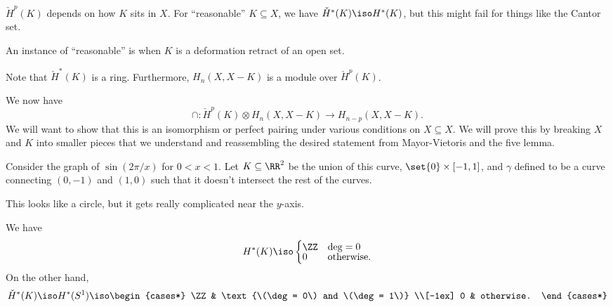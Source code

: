 \documentclass{standalone}
\begin{document}
\begin{remark}
  \(\check{H}^p(K)\) depends on how \(K\) sits in \(X\).
  For ``reasonable'' \(K \subseteq X\),
  we have \(\check{H}^*(K) \iso H^*(K)\),
  but this might fail for things like the Cantor set.

  An instance of ``reasonable'' is when \(K\) is a deformation retract
  of an open set.
\end{remark}

Note that \(\check{H}^*(K)\) is a ring.
Furthermore, \(H_n(X, X-K)\) is a module over \(\check{H}^p(K)\).

We now have
\[
  \cap \colon \check{H}^p(K) \otimes H_n(X, X-K) \to H_{n-p}(X, X-K).
\]
We will want to show that this is an isomorphism or perfect pairing
under various conditions on \(X \subseteq X\).
We will prove this by breaking \(X\) and \(K\) into smaller pieces
that we understand and reassembling the desired statement from Mayor-Vietoris
and the five lemma.

\begin{example}
  Consider the graph of \(\sin(2\pi / x)\) for \(0 < x < 1\).
  Let \(K \subseteq \RR^2\) be the union of
    this curve,
    \(\set{0} \times [-1, 1]\), and
    \(\gamma\) defined to be a curve connecting \((0, -1)\) and \((1, 0)\)
    such that it doesn't intersect the rest of the curves.

  This looks like a circle,
  but it gets really complicated near the \(y\)-axis.

  We have
  \[
    H^*(K) \iso \begin{cases}
      \ZZ & \deg = 0 \\[-1ex]
      0 & \text{otherwise}.
    \end{cases}
  \]
  On the other hand,
  \[
    \check H^*(K) \iso H^*(S^1) \iso \begin{cases*}
      \ZZ & \text{\(\deg = 0\) and \(\deg = 1\)} \\[-1ex]
      0 & otherwise.
    \end{cases*}
  \]
\end{example}
\end{document}
